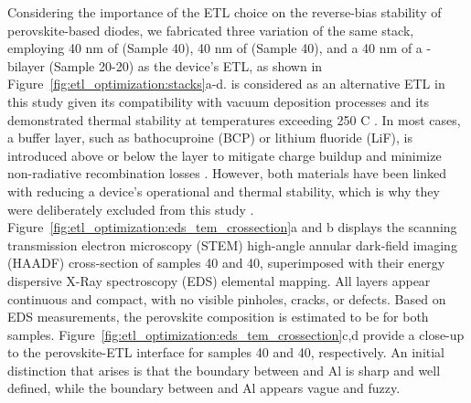Considering the importance of the ETL choice on the reverse-bias stability of perovskite-based diodes, we fabricated three variation of the same stack, employing 40 nm of  (Sample 40), 40 nm of  (Sample 40), and a 40 nm of a - bilayer (Sample 20-20) as the device's ETL, as shown in Figure~\ref{fig:etl_optimization:stacks}a-d.  is considered as an alternative ETL in this study given its compatibility with vacuum deposition processes and its demonstrated thermal stability at temperatures exceeding 250 \degree C \cite{Sundar1992ThermalC60, Bracesco2024InPhotovoltaics}. In most cases, a buffer layer, such as bathocuproine (BCP) or lithium fluoride (LiF), is introduced above or below the  layer to mitigate charge buildup and minimize non-radiative recombination losses \cite{Chen2017EffectCells, Ye2022OvercomingCarborane}. However, both materials have been linked with reducing a device's operational and thermal stability, which is why they were deliberately excluded from this study \cite{Al-Ashouri2020MonolithicExtraction, Zheng2020EnhancedStrategy}. Figure~\ref{fig:etl_optimization:eds_tem_crossection}a and b displays the scanning transmission electron microscopy (STEM) high-angle annular dark-field imaging (HAADF) cross-section of samples 40 and 40, superimposed with their energy dispersive X-Ray spectroscopy (EDS) elemental mapping. All layers appear continuous and compact, with no visible pinholes, cracks, or defects. Based on EDS measurements, the perovskite composition is estimated to be  for both samples. Figure~\ref{fig:etl_optimization:eds_tem_crossection}c,d provide a close-up to the perovskite-ETL interface for samples 40 and 40, respectively. An initial distinction that arises is that the boundary between  and Al is sharp and well defined, while the boundary between  and Al appears vague and fuzzy.


